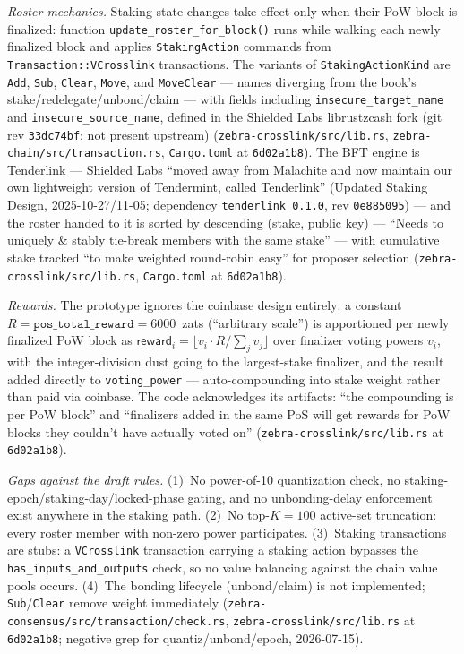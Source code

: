 \documentclass[11pt,a4paper]{article}
\theoremstyle{definition}
\begin{document}
\emph{Roster mechanics.} Staking state changes take effect only when
their PoW block is finalized: function
\texttt{update\_roster\_for\_block()} runs while walking each newly
finalized block and applies \texttt{StakingAction} commands from
\texttt{Transaction::VCrosslink} transactions. The variants of
\texttt{StakingActionKind} are \texttt{Add}, \texttt{Sub},
\texttt{Clear}, \texttt{Move}, and \texttt{MoveClear} --- names diverging
from the book's stake/redelegate/unbond/claim --- with fields including
\texttt{insecure\_target\_name} and \texttt{insecure\_source\_name},
defined in the Shielded Labs librustzcash fork (git rev
\texttt{33dc74bf}; not present upstream)
(\texttt{zebra-crosslink/src/lib.rs},
\texttt{zebra-chain/src/transaction.rs}, \texttt{Cargo.toml} at
\texttt{6d02a1b8}). The BFT engine is Tenderlink --- Shielded Labs
``moved away from Malachite and now maintain our own lightweight version
of Tendermint, called Tenderlink'' (Updated Staking Design,
2025-10-27/11-05; dependency \texttt{tenderlink 0.1.0}, rev
\texttt{0e885095}) --- and the roster handed to it is sorted by
descending (stake, public key) --- ``Needs to uniquely \& stably
tie-break members with the same stake'' --- with cumulative stake
tracked ``to make weighted round-robin easy'' for proposer selection
(\texttt{zebra-crosslink/src/lib.rs}, \texttt{Cargo.toml} at
\texttt{6d02a1b8}).

\emph{Rewards.} The prototype ignores the coinbase design entirely: a
constant $R = \texttt{pos\_total\_reward} = 6000$~zats (``arbitrary
scale'') is apportioned per newly finalized PoW block as
$\mathsf{reward}_i = \lfloor v_i \cdot R / \sum_j v_j \rfloor$ over
finalizer voting powers $v_i$, with the integer-division dust going to
the largest-stake finalizer, and the result added directly to
\texttt{voting\_power} --- auto-compounding into stake weight rather
than paid via coinbase. The code acknowledges its artifacts: ``the
compounding is per PoW block'' and ``finalizers added in the same PoS
will get rewards for PoW blocks they couldn't have actually voted on''
(\texttt{zebra-crosslink/src/lib.rs} at \texttt{6d02a1b8}).

\emph{Gaps against the draft rules.} (1)~No power-of-10 quantization
check, no staking-epoch/staking-day/locked-phase gating, and no
unbonding-delay enforcement exist anywhere in the staking path. (2)~No
top-$K = 100$ active-set truncation: every roster member with non-zero
power participates. (3)~Staking transactions are stubs: a
\texttt{VCrosslink} transaction carrying a staking action bypasses the
\texttt{has\_inputs\_and\_outputs} check, so no value balancing against
the chain value pools occurs. (4)~The bonding lifecycle (unbond/claim)
is not implemented; \texttt{Sub}/\texttt{Clear} remove weight
immediately (\texttt{zebra-consensus/src/transaction/check.rs},
\texttt{zebra-crosslink/src/lib.rs} at \texttt{6d02a1b8}; negative grep
for quantiz/unbond/epoch, 2026-07-15).
\end{document}
